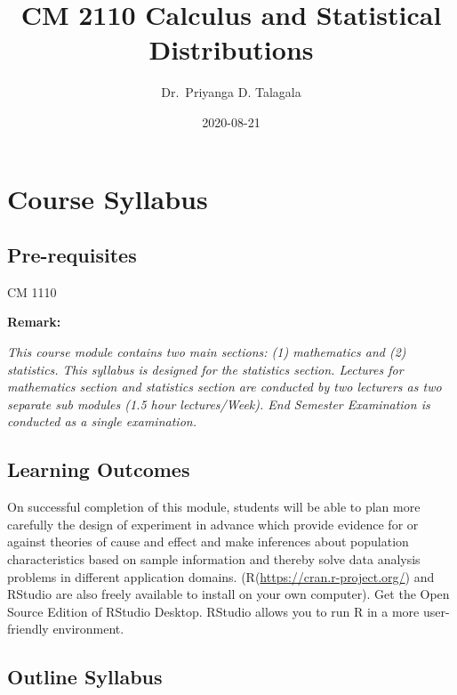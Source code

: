 \documentclass[]{book}
\title{CM 2110 Calculus and Statistical Distributions}
\author{Dr.~Priyanga D. Talagala}
\date{2020-08-21}
\begin{document}
\maketitle

{
\setcounter{tocdepth}{1}
\tableofcontents
}
\hypertarget{course-syllabus}{%
\chapter*{Course Syllabus}\label{course-syllabus}}

\hypertarget{pre-requisites}{%
\section*{Pre-requisites}\label{pre-requisites}}

CM 1110

\textbf{Remark:}

\emph{This course module contains two main sections: (1) mathematics and (2) statistics. This syllabus is designed for the statistics section. Lectures for mathematics section and statistics section are conducted by two lecturers as two separate sub modules (1.5 hour lectures/Week). End Semester Examination is conducted as a single examination.}

\hypertarget{learning-outcomes}{%
\section*{Learning Outcomes}\label{learning-outcomes}}

On successful completion of this module, students will be able to plan more carefully the design of experiment in advance which provide evidence for or against theories of cause and effect and make inferences about population characteristics based on sample information and thereby solve data analysis problems in different application domains. (R(\url{https://cran.r-project.org/}) and RStudio are also freely available to install on your own computer). Get the Open Source Edition of RStudio Desktop. RStudio allows you to run R in a more user-friendly environment.

\hypertarget{outline-syllabus}{%
\section*{Outline Syllabus}\label{outline-syllabus}}
\end{document}
